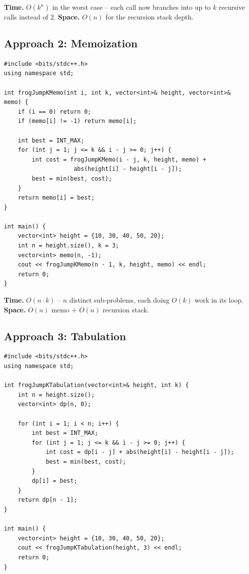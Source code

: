 \begin{complexitybox}
\textbf{Time.} $O(k^n)$ in the worst case -- each call now branches
into up to $k$ recursive calls instead of $2$.
\textbf{Space.} $O(n)$ for the recursion stack depth.
\end{complexitybox}

\subsection*{Approach 2: Memoization}

\begin{lstlisting}
#include <bits/stdc++.h>
using namespace std;

int frogJumpKMemo(int i, int k, vector<int>& height, vector<int>& memo) {
    if (i == 0) return 0;
    if (memo[i] != -1) return memo[i];

    int best = INT_MAX;
    for (int j = 1; j <= k && i - j >= 0; j++) {
        int cost = frogJumpKMemo(i - j, k, height, memo) +
                    abs(height[i] - height[i - j]);
        best = min(best, cost);
    }
    return memo[i] = best;
}

int main() {
    vector<int> height = {10, 30, 40, 50, 20};
    int n = height.size(), k = 3;
    vector<int> memo(n, -1);
    cout << frogJumpKMemo(n - 1, k, height, memo) << endl;
    return 0;
}
\end{lstlisting}

\begin{complexitybox}
\textbf{Time.} $O(n \cdot k)$ -- $n$ distinct sub-problems, each doing
$O(k)$ work in its loop.
\textbf{Space.} $O(n)$ memo $+$ $O(n)$ recursion stack.
\end{complexitybox}

\subsection*{Approach 3: Tabulation}

\begin{lstlisting}
#include <bits/stdc++.h>
using namespace std;

int frogJumpKTabulation(vector<int>& height, int k) {
    int n = height.size();
    vector<int> dp(n, 0);

    for (int i = 1; i < n; i++) {
        int best = INT_MAX;
        for (int j = 1; j <= k && i - j >= 0; j++) {
            int cost = dp[i - j] + abs(height[i] - height[i - j]);
            best = min(best, cost);
        }
        dp[i] = best;
    }
    return dp[n - 1];
}

int main() {
    vector<int> height = {10, 30, 40, 50, 20};
    cout << frogJumpKTabulation(height, 3) << endl;
    return 0;
}
\end{lstlisting}

